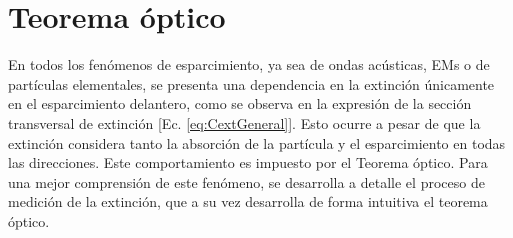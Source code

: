 \section{Teorema óptico}
En todos los fenómenos de esparcimiento, ya sea de ondas acústicas, EMs o de partículas elementales, se presenta una dependencia en la extinción únicamente en el esparcimiento delantero, como se observa en la expresión de la sección transversal de extinción [Ec. \eqref{eq:CextGeneral}]. Esto ocurre a pesar de que la extinción considera tanto la absorción de la partícula y el esparcimiento en todas las direcciones. Este comportamiento es impuesto por el Teorema óptico. Para una mejor comprensión de este fenómeno, se desarrolla a detalle el proceso de medición de la extinción, que a su vez desarrolla de forma intuitiva el teorema óptico.

